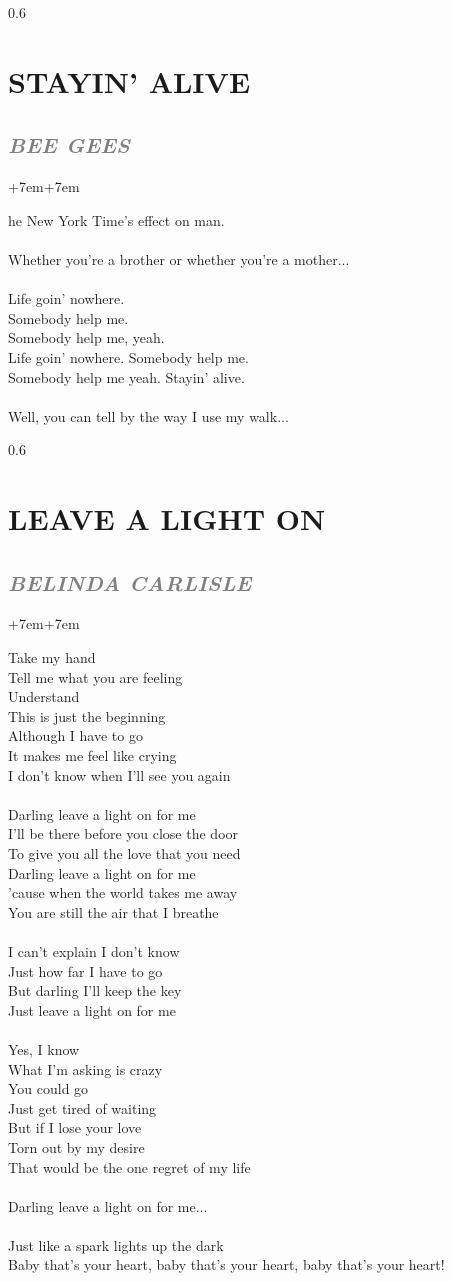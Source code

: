 \documentclass[100pt,a4paper]{report}
\newenvironment{song1}[3]
	{
			\begin{spacing}{0.6}
				\section*{\LARGE\centering \MakeUppercase{\textbf{{#1}}}}
				\subsection*{\Large\centering \textit{\textcolor{gray}{\MakeUppercase{{#2}}}}}
			\end{spacing}
			\vspace{0.8cm}
			\begin{adjustwidth}{+7em}{+7em}
			\Large
			
	}
	{
		\end{adjustwidth}
		\newpage
    }
\begin{document}
\begin{song1}{Stayin' alive}{Bee Gees}
the New York Time's effect on man.\\
\\
Whether you're a brother or whether you're a mother...\\
\\
Life goin' nowhere.\\
Somebody help me.\\
Somebody help me, yeah.\\
Life goin' nowhere. Somebody help me.\\
Somebody help me yeah. Stayin' alive.\\
\\
Well, you can tell by the way I use my walk...
\end{song1}

\begin{song1}{Leave a Light On}{Belinda Carlisle}
\noindent
Take my hand\\
Tell me what you are feeling\\
Understand\\
This is just the beginning\\
Although I have to go\\
It makes me feel like crying\\
I don't know when I'll see you again\\
\\
Darling leave a light on for me\\
I'll be there before you close the door\\
To give you all the love that you need\\
Darling leave a light on for me\\
'cause when the world takes me away\\
You are still the air that I breathe\\
\\
I can't explain I don't know\\
Just how far I have to go\\
But darling I'll keep the key\\
Just leave a light on for me\\
\\
Yes, I know\\
What I'm asking is crazy\\
You could go\\
Just get tired of waiting\\
But if I lose your love\\
Torn out by my desire\\
That would be the one regret of my life\\
\\
Darling leave a light on for me...\\
\\
Just like a spark lights up the dark\\
Baby that's your heart, baby that's your heart, baby that's your heart!
\end{song1}
\end{document}
